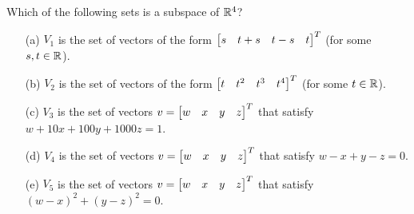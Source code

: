\documentclass[a4paper]{amsart}
\begin{document}
\begin{exercise}\label{ex-subspace-ii}
 Which of the following sets is a subspace of ${\mathbb{R}}^4$?
 \begin{itemize}
  \item[(a)] $V_1$ is the set of vectors of the form
   $\left[\begin{matrix} s&t+s&t-s&t\end{matrix}\right]^T$ (for some $s,t\in{\mathbb{R}}$).
  \item[(b)] $V_2$ is the set of vectors of the form
   $\left[\begin{matrix} t&t^2&t^3&t^4\end{matrix}\right]^T$ (for some $t\in{\mathbb{R}}$).
  \item[(c)] $V_3$ is the set of vectors
   $v=\left[\begin{matrix} w&x&y&z\end{matrix}\right]^T$ that satisfy $w+10x+100y+1000z=1$.
  \item[(d)] $V_4$ is the set of vectors
   $v=\left[\begin{matrix} w&x&y&z\end{matrix}\right]^T$ that satisfy $w-x+y-z=0$.
  \item[(e)] $V_5$ is the set of vectors
   $v=\left[\begin{matrix} w&x&y&z\end{matrix}\right]^T$ that satisfy $(w-x)^2+(y-z)^2=0$.
 \end{itemize}
\end{exercise}
\end{document}
